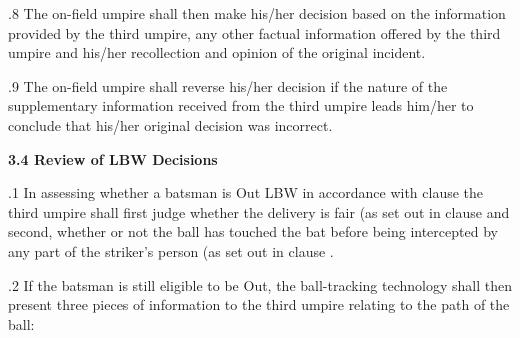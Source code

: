 \documentclass[12pt]{article}
\begin{document}
\vspace{\baselineskip}
\begin{adjustwidth}{0.5in}{0.17in}
{\fontsize{9pt}{10.8pt}.8 \tabto{0.49in} The on-field umpire shall then make his/her decision based on the information provided by the third umpire, any other factual information offered by the third umpire and his/her recollection and opinion of the original incident.\par}\par

\end{adjustwidth}


\vspace{\baselineskip}
\begin{adjustwidth}{0.5in}{0.31in}
{\fontsize{9pt}{10.8pt}.9 \tabto{0.49in} The on-field umpire shall reverse his/her decision if the nature of the supplementary information received from the third umpire leads him/her to conclude that his/her original decision was incorrect.\par}\par

\end{adjustwidth}


\vspace{\baselineskip}
{\fontsize{11pt}{13.2pt}\selectfont \textbf{3.4 \tabto{0.47in} Review of LBW Decisions}\par}\par


\vspace{\baselineskip}
\begin{adjustwidth}{0.5in}{0.11in}
{\fontsize{9pt}{10.8pt}.1 \tabto{0.49in} In assessing whether a batsman is Out LBW in accordance with clause the third umpire shall first judge whether the delivery is fair (as set out in clause and second, whether or not the ball has touched the bat before being intercepted by any part of the striker’s person (as set out in clause .\par}\par

\end{adjustwidth}


\vspace{\baselineskip}
\begin{adjustwidth}{0.5in}{0.51in}
{\fontsize{9pt}{10.8pt}.2 \tabto{0.49in} If the batsman is still eligible to be Out, the ball-tracking technology shall then present three pieces of information to the third umpire relating to the path of the ball:\par}\par

\end{adjustwidth}
\end{document}
